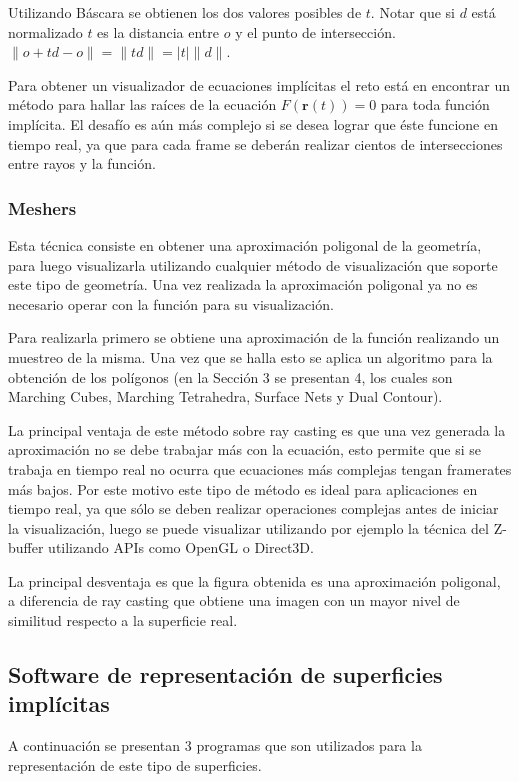 \documentclass[12pt]{article}
\begin{document}
Utilizando Báscara se obtienen los dos valores posibles de $t$. Notar que si $d$ está normalizado $t$ es la distancia entre $o$ y el punto de intersección. $\lVert o + td - o \rVert = \lVert td\rVert = |t|\lVert d \rVert$.

Para obtener un visualizador de ecuaciones implícitas el reto está en encontrar un método para hallar las raíces de la ecuación $F(\textbf{r}(t))=0$ para toda función implícita. El desafío es aún más complejo si se desea lograr que éste funcione en tiempo real, ya que para cada frame se deberán realizar cientos de intersecciones entre rayos y la función.  
\subsubsection{Meshers}
\noindent Esta técnica consiste en obtener una aproximación poligonal de la geometría, para luego visualizarla utilizando cualquier método de visualización que soporte este tipo de geometría. Una vez realizada la aproximación poligonal ya no es necesario operar con la función para su visualización.

Para realizarla primero se obtiene una aproximación de la función realizando un muestreo de la misma. Una vez que se halla esto se aplica un algoritmo para la obtención de los polígonos (en la Sección 3 se presentan 4, los cuales son Marching Cubes, Marching Tetrahedra, Surface Nets y Dual Contour)\cite{mykola1}\cite{mykola2}.

La principal ventaja de este método sobre ray casting es que una vez generada la aproximación no se debe trabajar más con la ecuación, esto permite que si se trabaja en tiempo real no ocurra que ecuaciones más complejas tengan framerates más bajos. Por este motivo este tipo de método es ideal para aplicaciones en tiempo real, ya que sólo se deben realizar operaciones complejas antes de iniciar la visualización, luego se puede visualizar utilizando por ejemplo la técnica del Z-buffer utilizando APIs como OpenGL o Direct3D.

La principal desventaja es que la figura obtenida es una aproximación poligonal, a diferencia de ray casting que obtiene una imagen con un mayor nivel de similitud respecto a la superficie real\cite{realtimerendering}.

\subsection{Software de representación de superficies implícitas}
\noindent A continuación se presentan 3 programas que son utilizados para la representación de este tipo de superficies.
\end{document}
